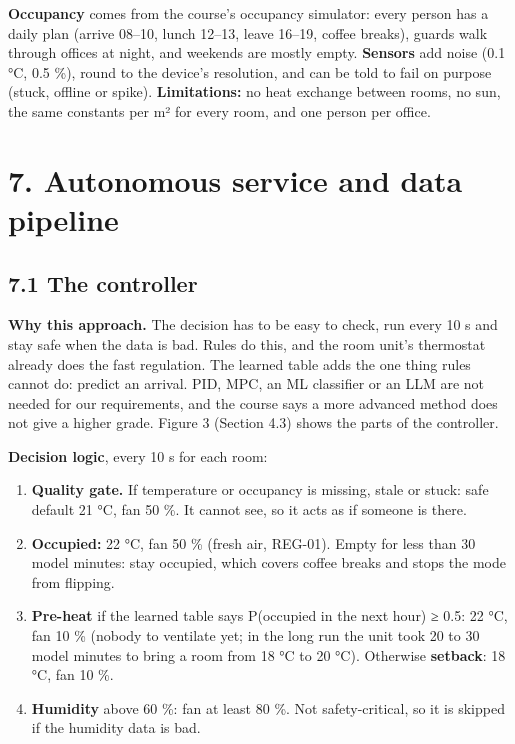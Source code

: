 \documentclass[11pt]{article}
\providecommand{\tightlist}{\setlength{\itemsep}{0pt}\setlength{\parskip}{0pt}}
\begin{document}
\textbf{Occupancy} comes from the course's occupancy simulator: every person has a daily plan
(arrive 08--10, lunch 12--13, leave 16--19, coffee breaks), guards walk through offices at night,
and weekends are mostly empty. \textbf{Sensors} add noise (0.1 °C, 0.5 \%), round to the device's
resolution, and can be told to fail on purpose (stuck, offline or spike).
\textbf{Limitations:} no heat exchange between rooms, no sun, the same constants per m² for every
room, and one person per office.

\section{7. Autonomous service and data pipeline}\label{autonomy}

\subsection{7.1 The controller}

\textbf{Why this approach.} The decision has to be easy to check, run every 10 s and stay safe
when the data is bad. Rules do this, and the room unit's thermostat already does the fast
regulation. The learned table adds the one thing rules cannot do: predict an arrival. PID, MPC,
an ML classifier or an LLM are not needed for our requirements, and the course says a more
advanced method does not give a higher grade. Figure 3 (Section 4.3) shows the parts of the controller.

\textbf{Decision logic}, every 10 s for each room:
\begin{enumerate}
\tightlist
\item \textbf{Quality gate.} If temperature or occupancy is missing, stale or stuck: safe default
  21 °C, fan 50 \%. It cannot see, so it acts as if someone is there.
\item \textbf{Occupied:} 22 °C, fan 50 \% (fresh air, REG-01). Empty for less than 30 model minutes:
  stay occupied, which covers coffee breaks and stops the mode from flipping.
\item \textbf{Pre-heat} if the learned table says P(occupied in the next hour) ≥ 0.5: 22 °C, fan
  10 \% (nobody to ventilate yet; in the long run the unit took 20 to 30 model minutes to bring a room from 18 °C to 20 °C). Otherwise
  \textbf{setback}: 18 °C, fan 10 \%.
\item \textbf{Humidity} above 60 \%: fan at least 80 \%. Not safety-critical, so it is skipped if the
  humidity data is bad.
\end{enumerate}
\end{document}
